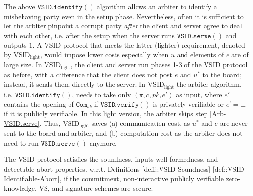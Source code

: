\begin{remark}\label{remark::light-VSID}
The above  $\mathtt{VSID.identify}()$ algorithm   allows an arbiter  to identify a misbehaving party even in the setup phase. Nevertheless, often it is sufficient  to let the arbiter pinpoint a corrupt party \emph{after} the client and server agree to deal with each other, i.e. after the setup when the server runs  $\mathtt{VSID.serve}()$ and outputs $1$. A VSID protocol that meets the latter (lighter) requirement, denoted by $\text{VSID}_{\scriptscriptstyle \text{light}}$, would impose lower costs  especially when $u$ and elements of $e$ are of large size. In  $\text{VSID}_{\scriptscriptstyle \text{light}}$, the client and server  run phases 1-3 of the VSID protocol as before, with a difference that the client does not post $e$ and $u^{\scriptscriptstyle*}$ to the board; instead, it sends them directly to the server. In $\text{VSID}_{\scriptscriptstyle\text{light}}$  the arbiter algorithm, i.e. $\mathtt{VSID.identify}()$, needs to take only $(\pi, c, pk, e')$ as input, where $e'$ contains the opening of $\mathtt{Com}_{\scriptscriptstyle {sk}}$ if $\mathtt{VSID.verify}()$ is privately verifiable or $e'=\bot$ if  it is publicly verifiable. In this light version, the arbiter   skips step \ref{Arb-VSID.serve}. Thus, $\text{VSID}_{\scriptscriptstyle\text{light}}$ saves (a)  communication cost, as   $u^{\scriptscriptstyle*}$ and $e$ are never sent to the board and  arbiter, and (b) computation  cost as the arbiter does not need to run $\mathtt{VSID.serve}()$ anymore.
\end{remark}


\begin{theorem}
The VSID protocol satisfies the soundness, inputs well-formedness, and detectable abort properties, w.r.t. Definitions \ref{deff::VSID-Soundness}-\ref{def::VSID-Identifiable-Abort}, if the commitment, non-interactive publicly verifiable zero-knowledge, VS, and signature schemes are secure. 
\end{theorem}













